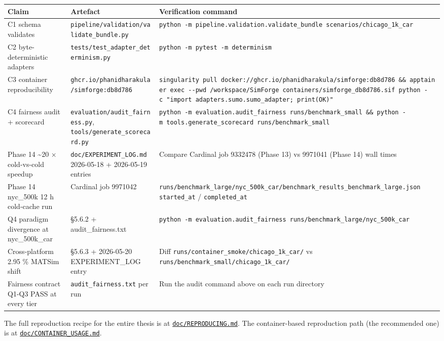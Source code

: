 \begin{longtable}[]{@{}lll@{}}
\toprule\noalign{}
Claim & Artefact & Verification command \\
\midrule\noalign{}
\endhead
\bottomrule\noalign{}
\endlastfoot
C1 schema validates & \texttt{pipeline/validation/validate\_bundle.py} &
\texttt{python\ -m\ pipeline.validation.validate\_bundle\ scenarios/chicago\_1k\_car} \\
C2 byte-deterministic adapters &
\texttt{tests/test\_adapter\_determinism.py} &
\texttt{python\ -m\ pytest\ -m\ determinism} \\
C3 container reproducibility &
\texttt{ghcr.io/phanidharakula/simforge:db8d786} &
\texttt{singularity\ pull\ docker://ghcr.io/phanidharakula/simforge:db8d786\ \&\&\ apptainer\ exec\ -\/-pwd\ /workspace/SimForge\ containers/simforge\_db8d786.sif\ python\ -c\ "import\ adapters.sumo.sumo\_adapter;\ print(\textquotesingle{}OK\textquotesingle{})"} \\
C4 fairness audit + scorecard & \texttt{evaluation/audit\_fairness.py},
\texttt{tools/generate\_scorecard.py} &
\texttt{python\ -m\ evaluation.audit\_fairness\ runs/benchmark\_small\ \&\&\ python\ -m\ tools.generate\_scorecard\ runs/benchmark\_small} \\
Phase 14 \textasciitilde20 × cold-vs-cold speedup &
\texttt{doc/EXPERIMENT\_LOG.md} 2026-05-18 + 2026-05-19 entries &
Compare Cardinal job 9332478 (Phase 13) vs 9971041 (Phase 14) wall
times \\
Phase 14 nyc\_500k 12 h cold-cache run & Cardinal job 9971042 &
\texttt{runs/benchmark\_large/nyc\_500k\_car/benchmark\_results\_benchmark\_large.json}
\texttt{started\_at} / \texttt{completed\_at} \\
Q4 paradigm divergence at nyc\_500k\_car & §5.6.2 + audit\_fairness.txt
&
\texttt{python\ -m\ evaluation.audit\_fairness\ runs/benchmark\_large/nyc\_500k\_car} \\
Cross-platform 2.95 \% MATSim shift & §5.6.3 + 2026-05-20
EXPERIMENT\_LOG entry & Diff
\texttt{runs/container\_smoke/chicago\_1k\_car/} vs
\texttt{runs/benchmark\_small/chicago\_1k\_car/} \\
Fairness contract Q1-Q3 PASS at every tier &
\texttt{audit\_fairness.txt} per run & Run the audit command above on
each run directory \\
\end{longtable}

The full reproduction recipe for the entire thesis is at
\href{../REPRODUCING.md}{\texttt{doc/REPRODUCING.md}}. The
container-based reproduction path (the recommended one) is at
\href{../CONTAINER_USAGE.md}{\texttt{doc/CONTAINER\_USAGE.md}}.
